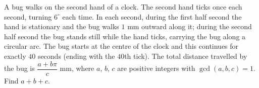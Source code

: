 A bug walks on the second hand of a clock. The second hand ticks once each second, turning $6^\circ$ each time. In each second, during the first half second the hand is stationary and the bug walks $1$ mm outward along it; during the second half second the bug stands still while the hand ticks, carrying the bug along a circular arc. The bug starts at the centre of the clock and this continues for exactly $40$ seconds (ending with the $40$th tick). The total distance travelled by the bug is $\dfrac{a+b\pi}{c}$ mm, where $a$, $b$, $c$ are positive integers with $\gcd(a,b,c)=1$. Find $a+b+c$.
